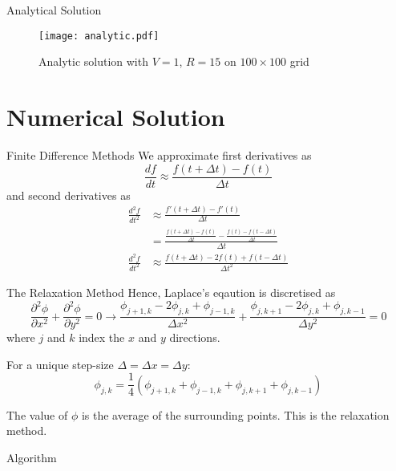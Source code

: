 \documentclass{beamer}
\newcommand{\be}{\begin{equation}}
\newcommand{\ee}{\end{equation}}
\begin{document}
\begin{frame}{Analytical Solution}

\begin{figure}[h!]
\begin{center}
\texttt{[image: analytic.pdf]}
\caption{Analytic solution with $V=1$, $R=15$ on $100\times100$ grid}
\end{center}
\end{figure}

\end{frame}

\section{Numerical Solution}

\begin{frame}{Finite Difference Methods}
We approximate first derivatives as
%
\be
\frac{df}{dt} \approx \frac{f(t+\Delta t) - f(t)}{\Delta t}
\ee
%
and second derivatives as
%
\begin{align}
\frac{d^2 f}{dt^2} &\approx \frac{f'(t+\Delta t) - f'(t)}{\Delta t} \\
		   &= \frac{\frac{f(t+\Delta t) - f(t)}{\Delta t} - \frac{f(t) - f(t-\Delta t)}{\Delta t}}{\Delta t} \\
\frac{d^2 f}{dt^2} &\approx  \frac{f(t+\Delta t) - 2f(t) + f(t-\Delta t)}{\Delta t^2}
\end{align}

\end{frame}

\begin{frame}{The Relaxation Method}
Hence, Laplace's eqaution is discretised as
%
\be
\frac{\partial^2 \phi}{\partial x^2}+\frac{\partial^2 \phi}{\partial y^2} = 0
\longrightarrow
\frac{\phi_{j+1,k}-2\phi_{j,k}+\phi_{j-1,k}}{\Delta x^2} + \frac{\phi_{j,k+1}-2\phi_{j,k}+\phi_{j,k-1}}{\Delta y^2}=0
\ee
%
where $j$ and $k$ index the $x$ and $y$ directions.

For a unique step-size $\Delta = \Delta x = \Delta y$:
%
\be
\phi_{j,k}= \frac{1}{4}(\phi_{j+1,k}+\phi_{j-1,k}+\phi_{j,k+1}+\phi_{j,k-1})
\ee

The value of $\phi$ is the average of the surrounding points.
This is the relaxation method. 

\end{frame}

\begin{frame}{Algorithm}
\end{frame}
\end{document}
